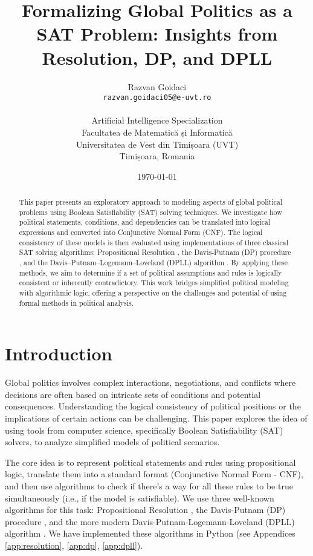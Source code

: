 \documentclass[11pt, a4paper]{article}
\title{Formalizing Global Politics as a SAT Problem: Insights from Resolution, DP, and DPLL}
\author{
    Razvan Goidaci \\
    \texttt{razvan.goidaci05@e-uvt.ro} \\ \\
    Artificial Intelligence Specialization \\
    Facultatea de Matematică și Informatică \\
    Universitatea de Vest din Timișoara (UVT) \\
    Timișoara, Romania %
}
\date{\today}
\begin{document}
\maketitle

\begin{abstract}
This paper presents an exploratory approach to modeling aspects of global political problems using Boolean Satisfiability (SAT) solving techniques. We investigate how political statements, conditions, and dependencies can be translated into logical expressions and converted into Conjunctive Normal Form (CNF). The logical consistency of these models is then evaluated using implementations of three classical SAT solving algorithms: Propositional Resolution \cite{Robinson1965}, the Davis-Putnam (DP) procedure \cite{DavisPutnam1960}, and the Davis–Putnam–Logemann–Loveland (DPLL) algorithm \cite{DPLL1962}. By applying these methods, we aim to determine if a set of political assumptions and rules is logically consistent or inherently contradictory. This work bridges simplified political modeling with algorithmic logic, offering a perspective on the challenges and potential of using formal methods in political analysis.
\end{abstract}

\section{Introduction}

Global politics involves complex interactions, negotiations, and conflicts where decisions are often based on intricate sets of conditions and potential consequences. Understanding the logical consistency of political positions or the implications of certain actions can be challenging. This paper explores the idea of using tools from computer science, specifically Boolean Satisfiability (SAT) solvers, to analyze simplified models of political scenarios.

The core idea is to represent political statements and rules using propositional logic, translate them into a standard format (Conjunctive Normal Form - CNF), and then use algorithms to check if there's a way for all these rules to be true simultaneously (i.e., if the model is satisfiable). We use three well-known algorithms for this task: Propositional Resolution \cite{Robinson1965}, the Davis-Putnam (DP) procedure \cite{DavisPutnam1960}, and the more modern Davis-Putnam-Logemann-Loveland (DPLL) algorithm \cite{DPLL1962}. We have implemented these algorithms in Python (see Appendices \ref{app:resolution}, \ref{app:dp}, \ref{app:dpll}).
\end{document}
